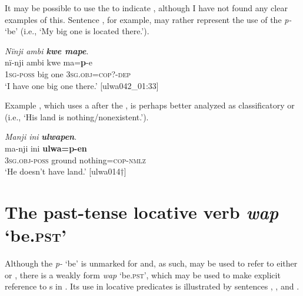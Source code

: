 It may be possible to use the  to indicate , although I have not found any clear examples of this. Sentence , for example, may rather represent the use of the  \textit{p-} ‘be’ (i.e., ‘My big one is located there.’).

\ea%
    \label{ex:pred:42}
          \textit{Nïnji ambi \textbf{kwe mape}}.\\
\gll nï-nji    ambi  kwe  ma=\textbf{p}{}-e\\
    1\textsc{sg-poss}  big    one    3\textsc{sg.obj}=\textsc{cop?-dep}\\
\glt `I have one big one there.’ [ulwa042\_01:33]
\z

Example , which uses a   after the , is perhaps better analyzed as  classificatory or  (i.e., ‘His land is nothing/nonexistent.’).


\ea%
    \label{ex:pred:43}
          \textit{Manji ini} \textbf{\textit{ulwapen}}.\\
\gll ma-nji      ini    \textbf{ulwa=p-en}\\
    3\textsc{sg.obj-poss}  ground  nothing=\textsc{cop-nmlz}\\
\glt `He doesn’t have land.’ [ulwa014†]
\z

\section{{The} {past-tense} {locative} {verb} {\textit{wap}} {‘be.\textsc{pst}}{’}}\label{sec:10.4}


Although the  \textit{p-} ‘be’ is unmarked for  and, as such, may be used to refer to either  or  , there is a weakly  form \textit{wap} ‘be.\textsc{pst}’, which may be used to make explicit reference to s in  . Its use in  locative predicates is illustrated by sentences , , and .

